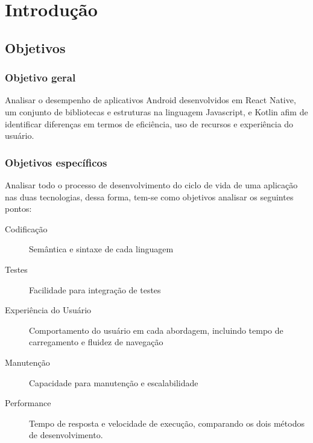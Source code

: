 \chapter{Introdução}

\section{Objetivos}
\subsection{Objetivo geral}
Analisar o desempenho de aplicativos Android desenvolvidos em React Native, um conjunto de bibliotecas e estruturas na linguagem Javascript, e  Kotlin afim de identificar diferenças em termos de eficiência, uso de recursos e experiência do usuário.
\subsection{Objetivos específicos}
Analisar todo o processo de desenvolvimento do ciclo de vida de uma aplicação nas duas tecnologias, dessa forma, tem-se como objetivos analisar os seguintes pontos:
\begin{description}
	\item[Codificação] Semântica e sintaxe de cada linguagem
	\item[Testes] Facilidade para integração de testes
	\item[Experiência do Usuário] Comportamento do usuário em cada abordagem, incluindo tempo de carregamento e fluidez de navegação
	\item[Manutenção] Capacidade para manutenção e escalabilidade
	\item[Performance] Tempo de resposta e velocidade de execução, comparando os dois métodos de desenvolvimento.
\end{description}